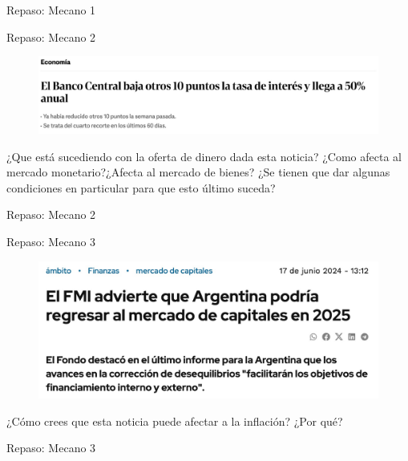 \documentclass{beamer}
\begin{document}
\begin{frame}{Repaso: Mecano 1}
    
\end{frame}

\begin{frame}{Repaso: Mecano 2}

    \begin{figure}[h!]
        \centering
        \includegraphics[width=1\textwidth]{../Figures/ejercicio_noticia3.jpg}
    \end{figure}
    ¿Que está sucediendo con la oferta de dinero dada esta noticia? ¿Como afecta al mercado monetario?¿Afecta al mercado de bienes? ¿Se tienen que dar algunas condiciones en particular para que esto último suceda?
\end{frame}

\begin{frame}{Repaso: Mecano 2}
    
\end{frame}
\begin{frame}{Repaso: Mecano 3}

    \begin{figure}[h!]
        \centering
        \includegraphics[width=1\textwidth]{../Figures/ejercicio_noticia1.jpg}
    \end{figure}
    ¿Cómo crees que esta noticia puede afectar a la inflación? ¿Por qué?
\end{frame}

\begin{frame}{Repaso: Mecano 3}
    
\end{frame}
\end{document}
